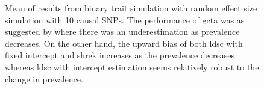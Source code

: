 \documentclass[12pt]{scrbook}
\begin{document}
\begin{figure}
{		
		\label{fig:ldscInCC10RandMean}
	}
	\caption[Mean of Binary Trait Simulation Results (10 Causal)]
	{Mean of results from binary trait simulation with random effect size simulation with 10 causal \glspl{SNP}.
		The performance of \gls{gcta} was as suggested by \citet{Golan2014} where there was an underestimation as prevalence decreases.
		On the other hand, the upward bias of both \gls{ldsc} with fixed intercept and \gls{shrek} increases as the prevalence decreases whereas \gls{ldsc} with intercept estimation seems relatively robust to the change in prevalence.
	} 
	\label{fig:CC10RandMean}
\end{figure}
\end{document}
